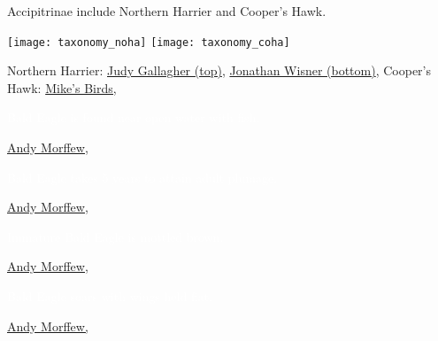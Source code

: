 \documentclass[t]{beamer}
\newcommand{\backoneline}{\vspace{-\baselineskip}}
\begin{document}
\begin{frame}{Accipitrinae include Northern Harrier and Cooper's Hawk.}
\backoneline

\begin{multicols}{2}
\texttt{[image: taxonomy\_noha]} \hfill
\texttt{[image: taxonomy\_coha]}

\end{multicols}

\vfilll

\tiny Northern Harrier: \href{https://flickr.com/photos/52450054@N04/52848994837}{Judy Gallagher (top)}, \href{https://flickr.com/photos/jwcolo/8714842140}{Jonathan Wisner (bottom)},  \hfill Cooper's Hawk: \href{https://flickr.com/photos/pazzani/36473380835}{Mike's Birds, }

\end{frame}

{
\begin{frame}{\textcolor{white}{Bald Eagle is found near open water with fish.}}


\tinyfill \textcolor{white}{\href{https://www.flickr.com/photos/andymorffew/30742412415}{Andy Morffew, }}
\end{frame}
}

{
\begin{frame}{\textcolor{white}{Bald Eagle takes 5 years to attain adult plumage.}}


\tinyfill \textcolor{white}{\href{https://www.flickr.com/photos/andymorffew/30742412415}{Andy Morffew, }}
\end{frame}
}

{
\begin{frame}{\textcolor{white}{Immature Bald Eagle is mottled brown.}}


\tinyfill \textcolor{white}{\href{https://www.flickr.com/photos/andymorffew/46931504035}{Andy Morffew, }}
\end{frame}
}

{
\begin{frame}{\textcolor{white}{Bald Eagle soars with wings held flat.}}


\tinyfill \textcolor{white}{\href{https://www.flickr.com/photos/andymorffew/28687274768}{Andy Morffew, }}
\end{frame}
}
\end{document}
